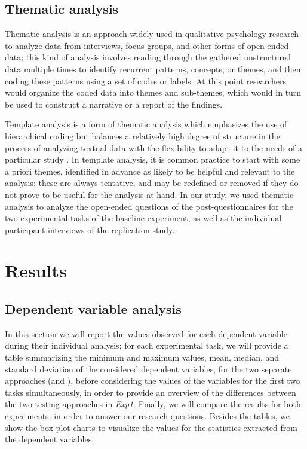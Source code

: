 \subsection{Thematic analysis}
Thematic analysis is an approach widely used in qualitative psychology research to analyze data from interviews, focus groups, and other forms of open-ended data; this kind of analysis involves reading through the gathered unstructured data multiple times to identify recurrent patterns, concepts, or themes, and then coding these patterns using a set of codes or labels. At this point researchers would organize the coded data into themes and sub-themes, which would in turn be used to construct a narrative or a report of the findings.

Template analysis is a form of thematic analysis which emphasizes the use of hierarchical coding but balances a relatively high degree of structure in the process of analyzing textual data with the flexibility to adapt it to the needs of a particular study \cite{ThematicAnalysis}. In template analysis, it is common practice to start with some a priori themes, identified in advance as likely to be helpful and relevant to the analysis; these are always tentative, and may be redefined or removed if they do not prove to be useful for the analysis at hand. In our study, we used thematic analysis to analyze the open-ended questions of the post-questionnaires for the two experimental tasks of the baseline experiment, as well as the individual participant interviews of the replication study.



\section{Results}
\subsection{Dependent variable analysis}
In this section we will report the values observed for each dependent variable during their individual analysis; for each experimental task, we will provide a table summarizing the minimum and maximum values, mean, median, and standard deviation of the considered dependent variables, for the two separate approaches (\ie \tdd and \notdd), before considering the values of the variables for the first two tasks simultaneously, in order to provide an overview of the differences between the two testing approaches in \textit{Exp1}.
Finally, we will compare the results for both experiments, in order to answer our research questions.
Besides the tables, we show the box plot charts to visualize the values for the statistics extracted from the dependent variables.

